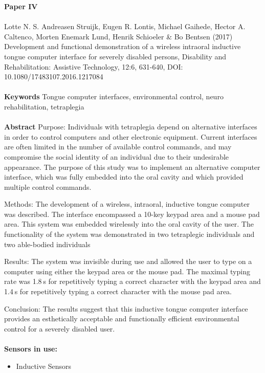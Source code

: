 \noindent
\textbf{Paper IV} 
\\ \\
\noindent
Lotte N. S. Andreasen Struijk, Eugen R. Lontis, Michael Gaihede, Hector A. Caltenco, Morten Enemark Lund, Henrik Schioeler & Bo Bentsen (2017) Development and functional demonstration of a wireless intraoral inductive tongue computer interface for severely disabled persons, Disability and Rehabilitation: Assistive Technology, 12:6, 631-640, DOI: 10.1080/17483107.2016.1217084\\ \\

\noindent
\textbf{Keywords} Tongue computer interfaces, environmental control, neuro rehabilitation, tetraplegia
\\ \\

\noindent
\textbf{Abstract} Purpose: Individuals with tetraplegia depend on alternative interfaces in order to control computers and other electronic equipment. Current interfaces are often limited in the number of available control commands, and may compromise the social identity of an individual due to their undesirable appearance. The purpose of this study was to implement an alternative computer interface, which was fully embedded into the oral cavity and which provided multiple control commands.

Methods: The development of a wireless, intraoral, inductive tongue computer was described. The interface encompassed a 10-key keypad area and a mouse pad area. This system was embedded wirelessly into the oral cavity of the user. The functionality of the system was demonstrated in two tetraplegic individuals and two able-bodied individuals

Results: The system was invisible during use and allowed the user to type on a computer using either the keypad area or the mouse pad. The maximal typing rate was 1.8 s for repetitively typing a correct character with the keypad area and 1.4 s for repetitively typing a correct character with the mouse pad area.

Conclusion: The results suggest that this inductive tongue computer interface provides an esthetically acceptable and functionally efficient environmental control for a severely disabled user.
\\ \\


\noindent
\textbf{Sensors in use:}
\begin{itemize}
    \item Inductive Sensors \\ \\
\end{itemize}


